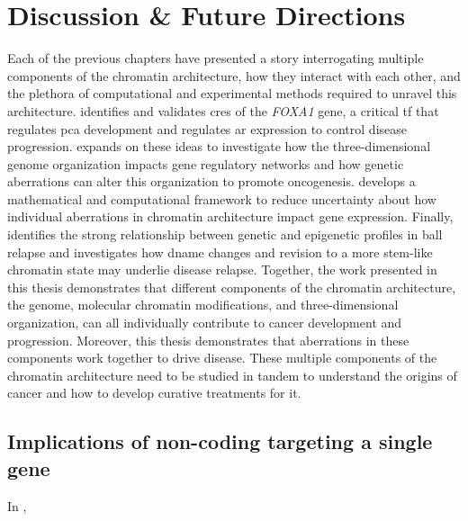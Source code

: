 \chapter{Discussion \& Future Directions}
\label{chap:discussion}

Each of the previous chapters have presented a story interrogating multiple components of the chromatin architecture, how they interact with each other, and the plethora of computational and experimental methods required to unravel this architecture.
 identifies and validates \glspl{cre} of the \emph{FOXA1} gene, a critical \gls{tf} that regulates \gls{pca} development and regulates \gls{ar} expression to control disease progression.
 expands on these ideas to investigate how the three-dimensional genome organization impacts gene regulatory networks and how genetic aberrations can alter this organization to promote oncogenesis.
 develops a mathematical and computational framework to reduce uncertainty about how individual aberrations in chromatin architecture impact gene expression.
Finally,  identifies the strong relationship between genetic and epigenetic profiles in \gls{ball} relapse and investigates how \gls{dname} changes and revision to a more stem-like chromatin state may underlie disease relapse.
Together, the work presented in this thesis demonstrates that different components of the chromatin architecture, the genome, molecular chromatin modifications, and three-dimensional organization, can all individually contribute to cancer development and progression.
Moreover, this thesis demonstrates that aberrations in these components work together to drive disease.
These multiple components of the chromatin architecture need to be studied in tandem to understand the origins of cancer and how to develop curative treatments for it.

\section{Implications of non-coding  targeting a single gene}

In ,

